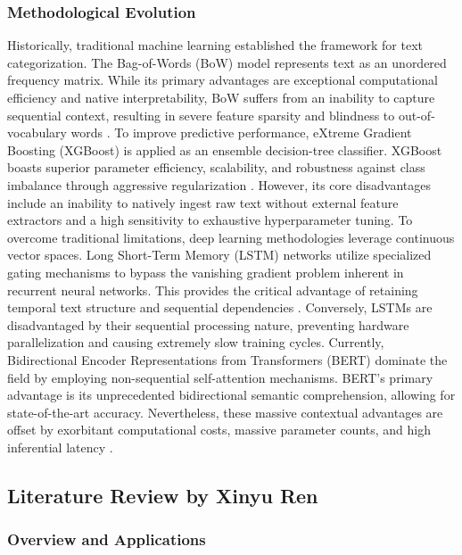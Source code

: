 \subsubsection{Methodological Evolution}

Historically, traditional machine learning established the framework for text categorization. The Bag-of-Words (BoW) model represents text as an unordered frequency matrix. While its primary advantages are exceptional computational efficiency and native interpretability, BoW suffers from an inability to capture sequential context, resulting in severe feature sparsity and blindness to out-of-vocabulary words \cite{manning2008introduction}. To improve predictive performance, eXtreme Gradient Boosting (XGBoost) is applied as an ensemble decision-tree classifier. XGBoost boasts superior parameter efficiency, scalability, and robustness against class imbalance through aggressive regularization \cite{chen2016xgboost}. However, its core disadvantages include an inability to natively ingest raw text without external feature extractors and a high sensitivity to exhaustive hyperparameter tuning. To overcome traditional limitations, deep learning methodologies leverage continuous vector spaces. Long Short-Term Memory (LSTM) networks utilize specialized gating mechanisms to bypass the vanishing gradient problem inherent in recurrent neural networks. This provides the critical advantage of retaining temporal text structure and sequential dependencies \cite{hochreiter1997long}. Conversely, LSTMs are disadvantaged by their sequential processing nature, preventing hardware parallelization and causing extremely slow training cycles. Currently, Bidirectional Encoder Representations from Transformers (BERT) dominate the field by employing non-sequential self-attention mechanisms. BERT's primary advantage is its unprecedented bidirectional semantic comprehension, allowing for state-of-the-art accuracy. Nevertheless, these massive contextual advantages are offset by exorbitant computational costs, massive parameter counts, and high inferential latency \cite{devlin2019bert}.

\subsection{Literature Review by Xinyu Ren}

\subsubsection{Overview and Applications}

